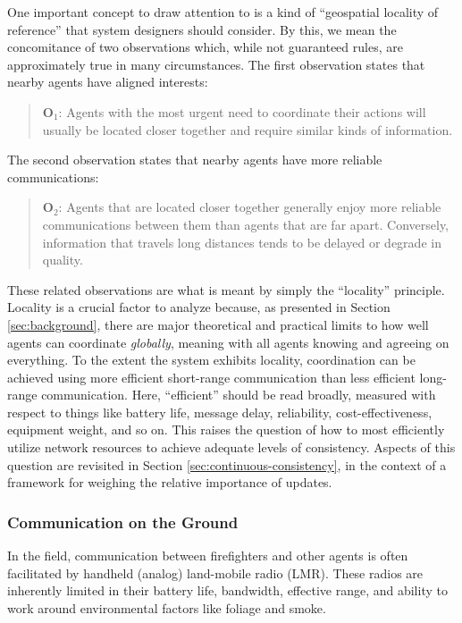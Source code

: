 \documentclass[]             %
{NASA}                       %
\theoremstyle{definition}
\begin{document}
One important concept to draw attention to is a kind of ``geospatial
locality of reference'' that system designers should consider. By
this, we mean the concomitance of two observations which, while not
guaranteed rules, are approximately true in many circumstances. The
first observation states that nearby agents have aligned interests:
\begin{quote}
  $\textbf{O}_1$: Agents with the most urgent need to coordinate their
  actions will usually be located closer together and require similar
  kinds of information.
\end{quote}
The second observation states that nearby agents have more reliable
communications:
\begin{quote}
  $\textbf{O}_2$: Agents that are located closer together generally
  enjoy more reliable communications between them than agents that are
  far apart. Conversely, information that travels long distances tends to
  be delayed or degrade in quality.
\end{quote}

These related observations are what is meant by simply the
``locality'' principle. Locality is a crucial factor to analyze
because, as presented in Section \ref{sec:background}, there are major
theoretical and practical limits to how well agents can coordinate
\emph{globally}, meaning with all agents knowing and agreeing on
everything. To the extent the system exhibits locality, coordination
can be achieved using more efficient short-range communication than
less efficient long-range communication. Here, ``efficient'' should be
read broadly, measured with respect to things like battery life,
message delay, reliability, cost-effectiveness, equipment weight, and
so on. This raises the question of how to most efficiently utilize
network resources to achieve adequate levels of consistency. Aspects
of this question are revisited in Section
\ref{sec:continuous-consistency}, in the context of a framework for
weighing the relative importance of updates.

\subsubsection{Communication on the Ground}
\label{sssec:ground-communication}
In the field, communication between firefighters and other agents is
often facilitated by handheld (analog) land-mobile radio (LMR). These
radios are inherently limited in their battery life, bandwidth,
effective range, and ability to work around environmental factors like
foliage and smoke.
\end{document}
